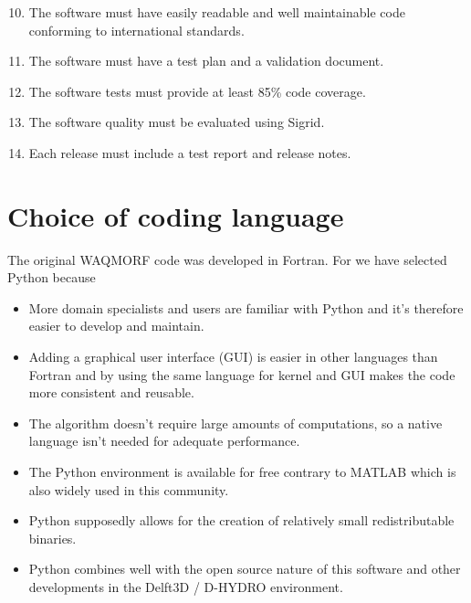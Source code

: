 \begin{enumerate}
\setcounter{enumi}{9} %
\item The software must have easily readable and well maintainable code conforming to international standards.
\item The software must have a test plan and a validation document.
\item The software tests must provide at least 85\% code coverage.
\item The software quality must be evaluated using Sigrid.
\item Each release must include a test report and release notes.
\end{enumerate}

\section{Choice of coding language}

The original WAQMORF code was developed in Fortran.
For \dfastmi we have selected Python because

\begin{itemize}
\item More domain specialists and users are familiar with Python and it's therefore easier to develop and maintain.
\item Adding a graphical user interface (GUI) is easier in other languages than Fortran and by using the same language for kernel and GUI makes the code more consistent and reusable.
\item The algorithm doesn't require large amounts of computations, so a native language isn't needed for adequate performance.
\item The Python environment is available for free contrary to MATLAB which is also widely used in this community.
\item Python supposedly allows for the creation of relatively small redistributable binaries.
\item Python combines well with the open source nature of this software and other developments in the Delft3D / D-HYDRO environment.
\end{itemize}
